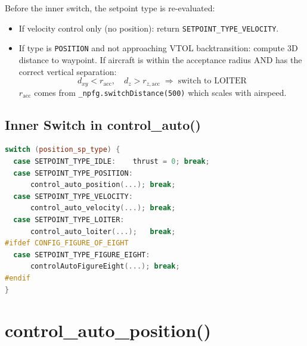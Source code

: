 \documentclass[12pt,a4paper]{article}
\begin{document}
Before the inner switch, the setpoint type is re-evaluated:
\begin{itemize}
  \item If velocity control only (no position): return
        \texttt{SETPOINT\_TYPE\_VELOCITY}.
  \item If type is \texttt{POSITION} and not approaching VTOL
        backtransition:
        compute 3D distance to waypoint. If aircraft is within the
        acceptance radius AND has the correct vertical separation:
        \begin{equation}
          d_{xy} < r_{\text{acc}}, \quad d_z > r_{z,\text{acc}}
          \;\Rightarrow\; \text{switch to LOITER}
        \end{equation}
        $r_{\text{acc}}$ comes from \texttt{\_npfg.switchDistance(500)}
        which scales with airspeed.
\end{itemize}

\subsection{Inner Switch in control\_auto()}

\begin{lstlisting}[language=C++]
switch (position_sp_type) {
  case SETPOINT_TYPE_IDLE:    thrust = 0; break;
  case SETPOINT_TYPE_POSITION:
      control_auto_position(...); break;
  case SETPOINT_TYPE_VELOCITY:
      control_auto_velocity(...); break;
  case SETPOINT_TYPE_LOITER:
      control_auto_loiter(...);   break;
#ifdef CONFIG_FIGURE_OF_EIGHT
  case SETPOINT_TYPE_FIGURE_EIGHT:
      controlAutoFigureEight(...); break;
#endif
}
\end{lstlisting}

\section{control\_auto\_position()}
\end{document}
